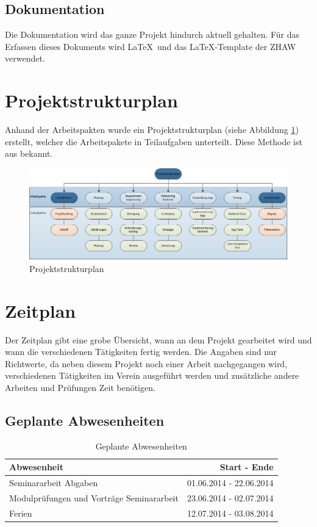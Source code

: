 \subsection{Dokumentation}\label{dokumentation}
Die Dokumentation wird das ganze Projekt hindurch aktuell gehalten. Für das Erfassen dieses Dokuments wird \LaTeX\ und das \LaTeX-Template der ZHAW verwendet.


\newpage
\section{Projektstrukturplan}\label{projektstrukturplan}
Anhand der Arbeitspakten wurde ein Projektstrukturplan (siehe Abbildung \ref{fig:psp}) erstellt, welcher die Arbeitspakete in Teilaufgaben unterteilt. Diese Methode ist aus \cite{proj_mgmt_book} bekannt.
\begin{figure}[h]
\centering
\includegraphics[scale=0.7]{images/visio/PSP.png}
\caption{Projektstrukturplan}
\label{fig:psp}
\end{figure}



\section{Zeitplan}\label{zeitplan}
Der Zeitplan gibt eine grobe Übersicht, wann an dem Projekt gearbeitet wird und wann die verschiedenen Tätigkeiten fertig werden. Die Angaben sind nur Richtwerte, da neben diesem Projekt noch einer Arbeit nachgegangen wird, verschiedenen Tätigkeiten im Verein ausgeführt werden und zusätzliche andere Arbeiten und Prüfungen Zeit benötigen.

\subsection{Geplante Abwesenheiten}
\begin{table}[ht]
\centering
  \begin{tabular}{ l | r }
	\hline
	\rowcolor{gray}
	Abwesenheit							&	Start - Ende	\\ \hline
	Seminararbeit Abgaben					&	01.06.2014 - 22.06.2014	\\ \hline
	Modulprüfungen und Vorträge Seminararbeit		&	23.06.2014 - 02.07.2014	\\ \hline
	Ferien								&	12.07.2014 - 03.08.2014	\\ \hline
  \end{tabular}
   \caption{Geplante Abwesenheiten}\label{table:holidays}
\end{table}

